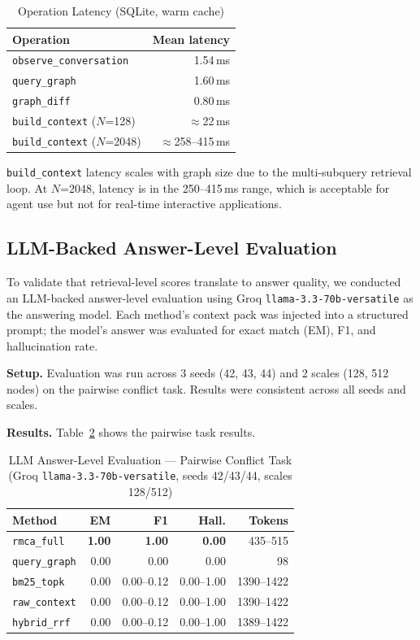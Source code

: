 \documentclass[conference]{IEEEtran}
\begin{document}
\begin{table}[htbp]
\caption{Operation Latency (SQLite, warm cache)}
\label{tab:latency}
\centering
\begin{tabular}{lr}
\toprule
\textbf{Operation} & \textbf{Mean latency} \\
\midrule
\texttt{observe\_conversation} & 1.54\,ms \\
\texttt{query\_graph}          & 1.60\,ms \\
\texttt{graph\_diff}           & 0.80\,ms \\
\texttt{build\_context} ($N$=128)  & $\approx$22\,ms \\
\texttt{build\_context} ($N$=2048) & $\approx$258--415\,ms \\
\bottomrule
\end{tabular}
\end{table}

\texttt{build\_context} latency scales with graph size due to the multi-subquery retrieval
loop. At $N$=2048, latency is in the 250--415\,ms range, which is acceptable for agent use
but not for real-time interactive applications.


\subsection{LLM-Backed Answer-Level Evaluation}

To validate that retrieval-level scores translate to answer quality, we conducted an
LLM-backed answer-level evaluation using Groq \texttt{llama-3.3-70b-versatile} as the
answering model. Each method's context pack was injected into a structured prompt; the
model's answer was evaluated for exact match (EM), F1, and hallucination rate.

\textbf{Setup.} Evaluation was run across 3 seeds (42, 43, 44) and 2 scales (128, 512 nodes)
on the pairwise conflict task. Results were consistent across all seeds and scales.

\textbf{Results.} Table~\ref{tab:groq_pairwise} shows the pairwise task results.

\begin{table}[htbp]
\caption{LLM Answer-Level Evaluation --- Pairwise Conflict Task\\
(Groq \texttt{llama-3.3-70b-versatile}, seeds 42/43/44, scales 128/512)}
\label{tab:groq_pairwise}
\centering
\begin{tabular}{lrrrr}
\toprule
\textbf{Method} & \textbf{EM} & \textbf{F1} & \textbf{Hall.} & \textbf{Tokens} \\
\midrule
\texttt{rmca\_full}  & \textbf{1.00} & \textbf{1.00} & \textbf{0.00} & 435--515 \\
\texttt{query\_graph} & 0.00 & 0.00 & 0.00 & 98 \\
\texttt{bm25\_topk}  & 0.00 & 0.00--0.12 & 0.00--1.00 & 1390--1422 \\
\texttt{raw\_context} & 0.00 & 0.00--0.12 & 0.00--1.00 & 1390--1422 \\
\texttt{hybrid\_rrf} & 0.00 & 0.00--0.12 & 0.00--1.00 & 1389--1422 \\
\bottomrule
\end{tabular}
\end{table}
\end{document}
